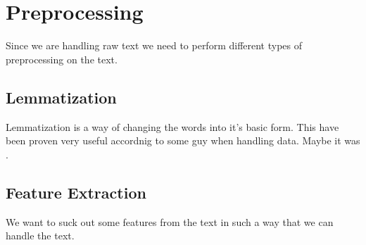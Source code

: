 \section{Preprocessing}
Since we are handling raw text we need to perform different types of preprocessing on the text.
\subsection{Lemmatization}
Lemmatization is a way of changing the words into it's basic form. This have been proven very useful accordnig to some guy when handling data. Maybe it was \cite{tretyakov2004machine}.
\subsection{Feature Extraction}
We want to suck out some features from the text in such a way that we can handle the text.